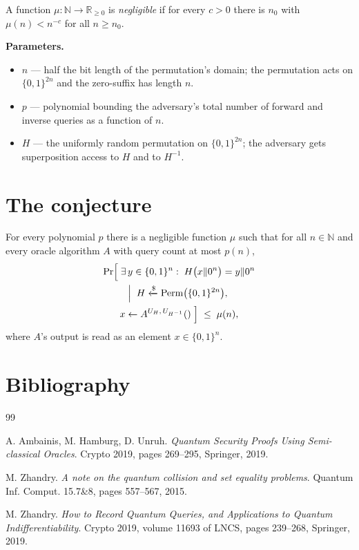 \documentclass{conjura-conjecture}
\newcommand{\Perm}{\mathrm{Perm}}
\newcommand{\NN}{\mathbb{N}}
\newcommand{\RR}{\mathbb{R}}
\newcommand{\bits}{\{0,1\}}
\begin{document}
A function $\mu : \NN \to \RR_{\ge 0}$ is \emph{negligible} if for
every $c > 0$ there is $n_0$ with $\mu(n) < n^{-c}$ for all
$n \ge n_0$.

\textbf{Parameters.}
\begin{itemize}[leftmargin=1.2em]
\item $n$ --- half the bit length of the permutation's domain; the
  permutation acts on $\bits^{2n}$ and the zero-suffix has length $n$.
\item $p$ --- polynomial bounding the adversary's total number of
  forward and inverse queries as a function of $n$.
\item $H$ --- the uniformly random permutation on $\bits^{2n}$; the
  adversary gets superposition access to $H$ and to $H^{-1}$.
\end{itemize}

\section{The conjecture}\label{sec:conjectures}

\begin{conjecture}
\label{conj:main}
For every polynomial $p$ there is a negligible function $\mu$ such
that for all $n \in \NN$ and every oracle algorithm $A$ with query
count at most $p(n)$,
\begin{multline*}
  \Pr\Bigl[\; \exists\, y \in \bits^n :\;
    H\bigl(x \| 0^n\bigr) = y \| 0^n \\
  \Bigm|\; H \xleftarrow{\$} \Perm\bigl(\bits^{2n}\bigr),\; \\
    x \leftarrow A^{U_H,\, U_{H^{-1}}}() \;\Bigr]
  \;\le\; \mu(n),
\end{multline*}
where $A$'s output is read as an element $x \in \bits^n$.
\end{conjecture}

\section{Bibliography}

\begin{conjurabibliography}{99}

A. Ambainis, M. Hamburg, D. Unruh.
\emph{Quantum Security Proofs Using Semi-classical Oracles}.
Crypto 2019, pages 269--295, Springer, 2019.

M. Zhandry.
\emph{A note on the quantum collision and set equality problems}.
Quantum Inf. Comput. 15.7\&8, pages 557--567, 2015.

M. Zhandry.
\emph{How to Record Quantum Queries, and Applications to Quantum
Indifferentiability}.
Crypto 2019, volume 11693 of LNCS, pages 239--268, Springer, 2019.

\end{conjurabibliography}
\end{document}
